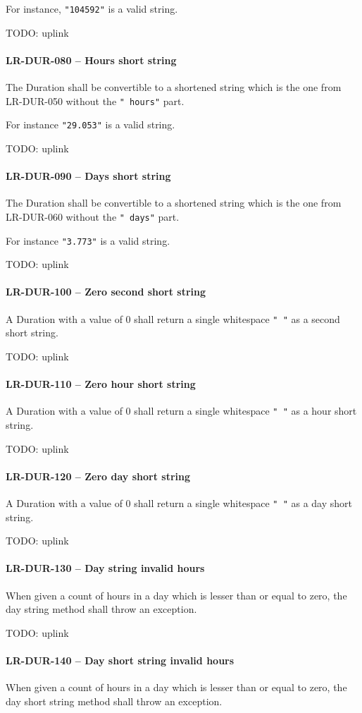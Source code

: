 For instance, \lstinline{"104592"} is a valid string.

TODO: uplink
\paragraph{LR-DUR-080 -- Hours short string}
The Duration shall be convertible to a shortened string
which is the one from LR-DUR-050 without the \lstinline{" hours"}
part.

For instance \lstinline{"29.053"} is a valid string.

TODO: uplink
\paragraph{LR-DUR-090 -- Days short string}
The Duration shall be convertible to a shortened string
which is the one from LR-DUR-060 without the \lstinline{" days"}
part.

For instance \lstinline{"3.773"} is a valid string.

TODO: uplink
\paragraph{LR-DUR-100 -- Zero second short string}
A Duration with a value of 0 shall return a single whitespace
\lstinline{" "} as a second short string.

TODO: uplink
\paragraph{LR-DUR-110 -- Zero hour short string}
A Duration with a value of 0 shall return a single whitespace
\lstinline{" "} as a hour short string.

TODO: uplink
\paragraph{LR-DUR-120 -- Zero day short string}
A Duration with a value of 0 shall return a single whitespace
\lstinline{" "} as a day short string.

TODO: uplink
\paragraph{LR-DUR-130 -- Day string invalid hours}
When given a count of hours in a day which is lesser than or equal to zero,
the day string method shall throw an exception.

TODO: uplink
\paragraph{LR-DUR-140 -- Day short string invalid hours}
When given a count of hours in a day which is lesser than or equal to zero,
the day short string method shall throw an exception.

